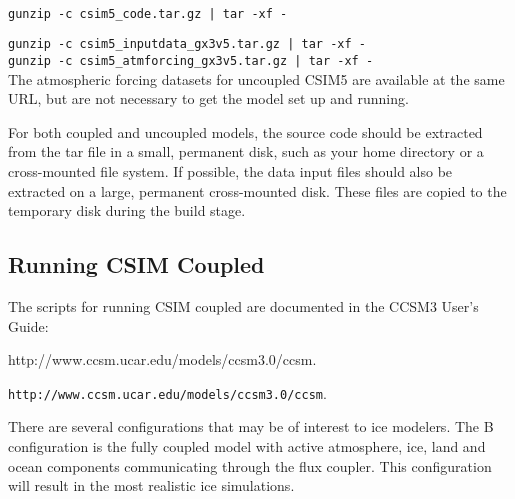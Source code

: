  \\

{\tt gunzip -c csim5\_code.tar.gz | tar -xf -}

{\tt gunzip -c csim5\_inputdata\_gx3v5.tar.gz | tar -xf -} \\

{\tt gunzip -c csim5\_atmforcing\_gx3v5.tar.gz | tar -xf -} \\

The atmospheric forcing datasets for uncoupled CSIM5 are available at the
same URL, but are not necessary to get the model set up and running.

For both coupled and uncoupled models, the source code should be extracted from
the tar file in a small, permanent disk, such as your home directory or a
cross-mounted file system.  If possible, the data input files should also be
extracted on a large, permanent cross-mounted disk. These files are copied
to the temporary disk during the build stage.


\subsection{Running CSIM Coupled}

The scripts for running CSIM coupled are documented in the CCSM3 User's Guide: \\

\begin{htmlonly}
                    {http://www.ccsm.ucar.edu/models/ccsm3.0/ccsm}. \\
\end{htmlonly}
\begin{latexonly}
                    {\tt http://www.ccsm.ucar.edu/models/ccsm3.0/ccsm}. \\
\end{latexonly}

There are several configurations that may be of interest to ice modelers.
The B configuration is the fully coupled model with active atmosphere, ice,
land and ocean components communicating through the flux coupler.  This
configuration will result in the most realistic ice simulations.

